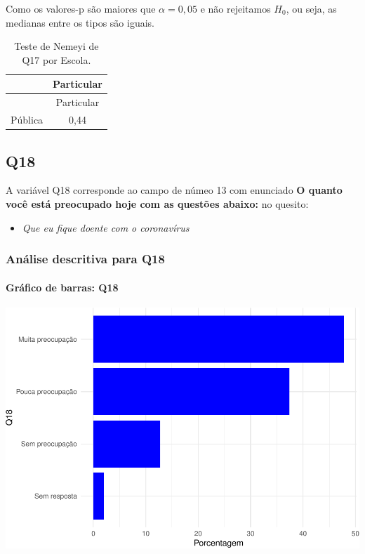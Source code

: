 \documentclass[]{article}
\providecommand{\tightlist}{%
  \setlength{\itemsep}{0pt}\setlength{\parskip}{0pt}}
\let\oldparagraph\paragraph
\renewcommand{\paragraph}[1]{\oldparagraph{#1}\mbox{}}
\begin{document}
Como os valores-p são maiores que \(\alpha=0,05\) e não rejeitamos \(H_0\), ou seja, as medianas entre os tipos são iguais.

\begin{longtable}[]{@{}lc@{}}
\caption{\label{tab:unnamed-chunk-215}Teste de Nemeyi de Q17 por Escola.}\tabularnewline
\toprule
& Particular\tabularnewline
\midrule
\endfirsthead
\toprule
& Particular\tabularnewline
\midrule
\endhead
Pública & 0,44\tabularnewline
\bottomrule
\end{longtable}

\cleardoublepage

\hypertarget{q18}{%
\subsection{Q18}\label{q18}}

A variável Q18 corresponde ao campo de númeo 13 com enunciado \textbf{O quanto você está preocupado hoje com as questões abaixo:} no quesito:

\begin{itemize}
\tightlist
\item
  \emph{Que eu fique doente com o coronavírus}
\end{itemize}

\hypertarget{anuxe1lise-descritiva-para-q18}{%
\subsubsection{Análise descritiva para Q18}\label{anuxe1lise-descritiva-para-q18}}

\hypertarget{gruxe1fico-de-barras-q18}{%
\paragraph{Gráfico de barras: Q18}\label{gruxe1fico-de-barras-q18}}

\begin{center}\includegraphics[width=0.75\linewidth]{relatorio_files/figure-latex/unnamed-chunk-216-1} \end{center}
\end{document}
